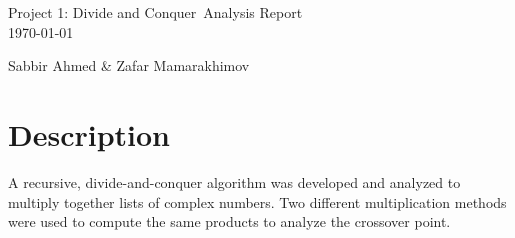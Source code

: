 \documentclass[usletter, 12pt]{article}
\newcommand{\project}{Project 1: Divide and Conquer}
\newcommand{\members}{Sabbir Ahmed \& Zafar Mamarakhimov}
\begin{document}
    \begin{titlepage}

        \vspace*{\fill} %
        \begin{center}

            {\LARGE \project~Analysis Report}\\ [1.5cm]

            \today
            
            \vspace*{\fill}

            \members

        \end{center}
        \vspace*{\fill} %

    \end{titlepage}

    \section{Description}
    A recursive, divide-and-conquer algorithm was developed and analyzed to multiply together lists of complex numbers. Two different multiplication methods were used to compute the same products to analyze the crossover point.



\end{document}
